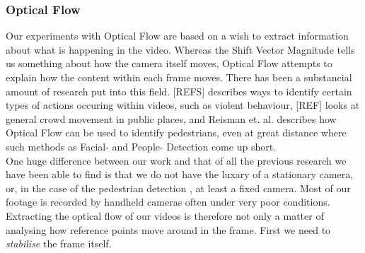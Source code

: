 \subsubsection{Optical Flow}
%
%
%
Our experiments with Optical Flow are based on a wish to extract information about what is happening in the video. Whereas the Shift Vector Magnitude tells us something about how the camera itself moves, Optical Flow attempts to explain how the content within each frame moves. There has been a substancial amount of research put into this field. [REFS] describes ways to identify certain types of actions occuring within videos, such as violent behaviour, [REF] looks at general crowd movement in public places, and Reisman et. al. \cite{CrowdDetectionInVideoSequences} describes how Optical Flow can be used to identify pedestrians, even at great distance where such methods as Facial- and People- Detection come up short.\\
%
One huge difference between our work and that of all the previous research we have been able to find is that we do not have the luxary of a stationary camera, or, in the case of the pedestrian detection \cite{CrowdDetectionInVideoSequences}, at least a fixed camera.
%
%
Most of our footage is recorded by handheld cameras often under very poor conditions. Extracting the optical flow of our videos is therefore not only a matter of analysing how reference points move around in the frame. First we need to \textit{stabilise} the frame itself.\\
%
%
%
